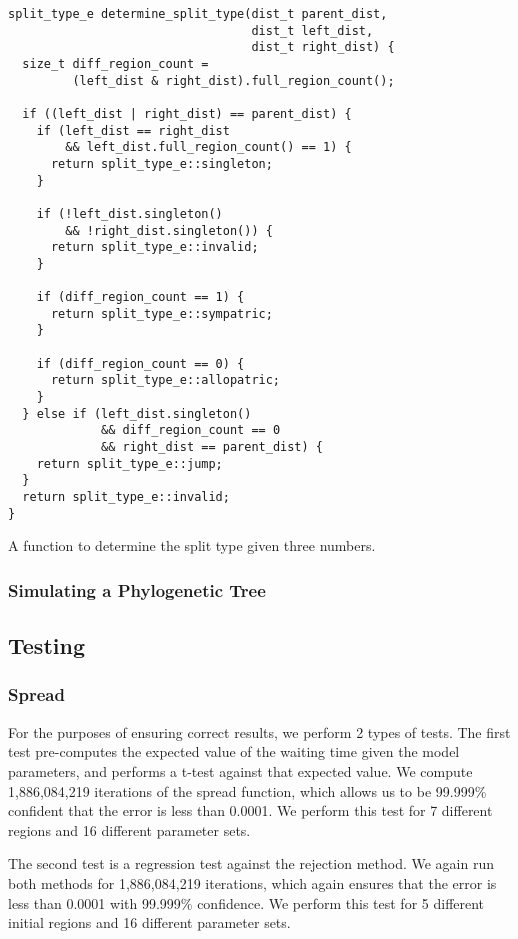 \documentclass{article}
\begin{document}
\begin{listing}
	\begin{verbatim}
split_type_e determine_split_type(dist_t parent_dist, 
                                  dist_t left_dist, 
                                  dist_t right_dist) {
  size_t diff_region_count =
         (left_dist & right_dist).full_region_count();

  if ((left_dist | right_dist) == parent_dist) {
    if (left_dist == right_dist 
        && left_dist.full_region_count() == 1) {
      return split_type_e::singleton;
    }

    if (!left_dist.singleton() 
        && !right_dist.singleton()) {
      return split_type_e::invalid;
    }

    if (diff_region_count == 1) {
      return split_type_e::sympatric;
    }

    if (diff_region_count == 0) {
      return split_type_e::allopatric;
    }
  } else if (left_dist.singleton()
             && diff_region_count == 0
             && right_dist == parent_dist) {
    return split_type_e::jump;
  }
  return split_type_e::invalid;
}
\end{verbatim}
	\caption{A function to determine the split type given three numbers.}
	\label{lst:determine-split-type}
\end{listing}

\subsubsection{Simulating a Phylogenetic Tree}


\subsection{Testing}

\subsubsection{Spread}

For the purposes of ensuring correct results, we perform 2 types of tests.
The first test pre-computes the expected value of the waiting time given the
model parameters, and performs a t-test against that expected value.
We compute 1,886,084,219 iterations of the spread function, which allows us to
be 99.999\% confident that the error is less than 0.0001.
We perform this test for 7 different regions and 16 different parameter sets.

The second test is a regression test against the rejection method.
We again run both methods for 1,886,084,219 iterations, which again ensures
that the error is less than 0.0001 with 99.999\% confidence.
We perform this test for 5 different initial regions and 16 different parameter
sets.
\end{document}
